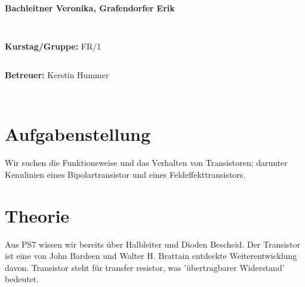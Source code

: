 \documentclass[12pt,a4paper,twopage]{article}
\begin{document}
\begin{verbatim}
\end{verbatim}
		\begin{flushleft}
			\textbf{\Large{Bachleitner Veronika, Grafendorfer Erik}} 
			\end{flushleft}

\begin{verbatim}


\end{verbatim}
			\begin{flushleft}
			\textbf{\Large{Kurstag/Gruppe:}} \Large{FR/1}
			\end{flushleft}

\begin{verbatim}

\end{verbatim}
			\begin{flushleft}
			\textbf{\Large{Betreuer:}} \Large{Kerstin Hummer}		
			\end{flushleft}
\newpage
\begin{verbatim}


\end{verbatim}
			
\section{Aufgabenstellung}
Wir suchen die Funktionsweise und das Verhalten von Transistoren; darunter Kennlinien eines Bipolartransistor und eines Feldeffekttransistors.
\section{Theorie}
Aus PS7 wissen wir bereits über Halbleiter und Dioden Bescheid. Der Transistor ist eine von John Bardeen und Walter H. Brattain entdeckte Weiterentwicklung davon. Transistor steht für transfer resistor, was 'übertragbarer Widerstand' bedeutet.
\end{document}
